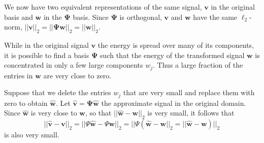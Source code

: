 We now have two equivalent representations of the same signal, $\bm v$ in the original basis and $\bm w$ in the $\bm\Psi$ basis.
Since $\bm\Psi$ is orthogonal, $\bm v$ and $\bm w$ have the same $\ell_2$-norm, $||\bm v||_2 = ||\bm\Psi\bm w||_2 = ||\bm w||_2$.

While in the original signal $\bm v$ the energy is spread over many of its components, it is possible to find a basis $\bm\Psi$ such that the energy of the transformed signal $\bm w$ is concentrated in only a few large components $w_j$.
Thus a large fraction of the entries in $\bm w$ are very close to zero.

Suppose that we delete the entries $w_j$ that are very small and replace them with zero to obtain $\bm{\hat w}$.
Let $\bm{\hat v} = \bm\Psi\hat{\bm w}$ the approximate signal in the original domain.
Since $\bm{\hat w}$ is very close to $\bm w$, so that $||\bm{\hat w} - \bm w||_2$ is very small, it follows that
\begin{equation*}
  ||\bm{\hat v} - \bm v||_2 = ||\Psi\bm{\hat w} - \Psi\bm w||_2 = ||\Psi (\bm{\hat w} - \bm w||_2 = ||\bm{\hat w} - \bm w)||_2
\end{equation*}
is also very small.

